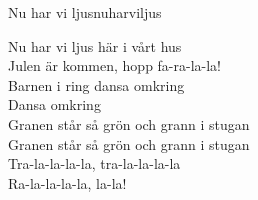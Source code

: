 \begin{song}{Nu har vi ljus}{nuharviljus}
\begin{vers}
Nu har vi ljus här i vårt hus\\
Julen är kommen, hopp fa-ra-la-la!\\
Barnen i ring dansa omkring\\
Dansa omkring\\
Granen står så grön och grann i stugan\\
Granen står så grön och grann i stugan\\
Tra-la-la-la-la, tra-la-la-la-la\\
Ra-la-la-la-la, la-la!\\
\end{vers}
\end{song}
